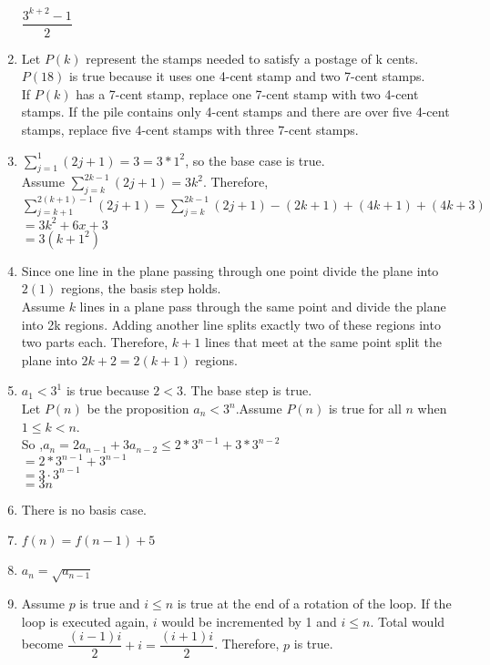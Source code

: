\documentclass[11pt]{article}
\begin{document}
\begin{enumerate}
	$\dfrac{3^{k+2}-1}{2}$
\item
	Let $P(k)$ represent the stamps needed to satisfy a postage of k cents.\\
	$P(18)$ is true because it uses one 4-cent stamp and two 7-cent stamps.\\
	If $P(k)$ has a 7-cent stamp, replace one 7-cent stamp with two 4-cent stamps. If the pile contains only 4-cent stamps and there are over five 4-cent stamps, replace five 4-cent stamps with three 7-cent stamps.
\item
	$\sum\limits_{j=1}^1 (2j+1) = 3 = 3*1^2$, so the base case is true.\\
	Assume $\sum\limits_{j=k}^{2k-1} (2j+1) = 3k^2$. Therefore,\\
	$\sum\limits_{j=k+1}^{2(k+1)-1} (2j+1) = \sum\limits_{j=k}^{2k-1} (2j+1) - (2k +1) + (4k + 1) + (4k+3)$\\
	$= 3k^2+ 6x + 3$\\
	$=3(k+1^2)$
\item
	Since one line in the plane passing through one point divide the plane into $2(1)$ regions, the basis step holds.\\
	Assume $k$ lines in a plane pass through the same point and divide the plane into 2k regions. Adding another line splits exactly two of these regions into two parts each. Therefore, $k+1$ lines that meet at the same point split the plane into $2k+2 = 2(k+1)$ regions.
\item
	$a_1 < 3^1$ is true because $2 < 3$. The base step is true.\\
	Let $P(n)$ be the proposition $a_n < 3^n$.Assume $P(n)$ is true for all $n$ when $1 \leq k < n$.\\
	So ,$a_n = 2a_{n - 1} + 3a_{n - 2} \leq 2 * 3^{n − 1} + 3 * 3^{n − 2} $\\
	$= 2 * 3^{n - 1} + 3^{n - 1} $\\
	$= 3 ⋅ 3^{n - 1}$\\
	$= 3n$
\item
	There is no basis case.
\item
	$f (n) = f (n - 1) + 5$
\item
	$a_n = \sqrt{a_{n-1}} $
\item
	Assume $p$ is true and $i \leq n$ is true at the end of a rotation of the loop. If the loop is executed again, $i$ would be incremented by 1 and $i \leq n$. Total would become $\dfrac{(i-1)i}{2} + i = \dfrac{(i+1)i}{2}$. Therefore, $p$ is true.
\end{enumerate}
\end{document}
